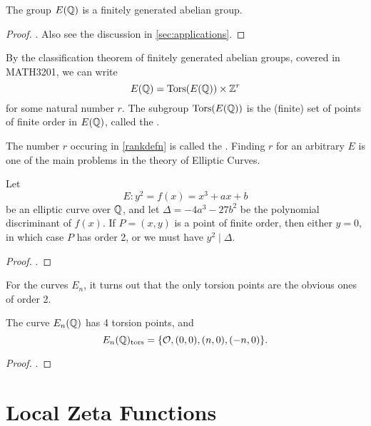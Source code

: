 \documentclass[12pt, a4paper]{report}
\begin{document}
\begin{thm}
  The group $E({\mathbb Q})$ is a finitely generated abelian group.
\end{thm}  
\begin{proof}
  \cite[See][Chapter III, pages 63-88]{rational}. Also see the discussion in
  \autoref{sec:applications}.
\end{proof}

By the classification theorem of finitely generated abelian groups, covered in
MATH3201, we can write
\begin{equation} \label{rankdefn}
E({\mathbb Q}) = {\text{\normalfont Tors}}(E({\mathbb Q})) \times {\mathbb Z}^r
\end{equation}
for some natural number $r$. The subgroup ${\text{\normalfont Tors}}(E({\mathbb Q}))$ is the (finite) set of
points of finite order in $E({\mathbb Q})$, called the .

\begin{defn}
  The number $r$ occuring in \autoref{rankdefn} is called the
  . Finding $r$ for an arbitrary $E$ is one of the main
  problems in the theory of Elliptic Curves.
\end{defn}

\begin{thm} \label{thm:nagelllutz}
  Let
  \[E: y^2 = f(x) = x^3 + ax + b\]
  be an elliptic curve over ${\mathbb Q}$, and let $\Delta = -4a^3 -27b^2$ be the
  polynomial discriminant of $f(x)$. If $P = (x,y)$ is a point of finite order,
  then either $y = 0$, in which case $P$ has order 2, or we must have $y^2 \mid \Delta$.
\end{thm}
\begin{proof}
  \cite[See][Chapter II, pages 49-56]{rational}.
\end{proof}

For the curves $E_n$, it turns out that the only torsion points are the obvious
ones of order 2.

\begin{prop} \label{proof:torsion}
  The curve $E_n({\mathbb Q})$ has 4 torsion points, and
  \[E_n({\mathbb Q})_{\textnormal{tors}} = \{{\mathcal O}, (0,0), (n,0), (-n,0)\}.\]
\end{prop}

\begin{proof}
  \cite[See][Chapter I-9, pages 44-45]{koblitz}.
\end{proof}

\section{Local Zeta Functions}
\end{document}
